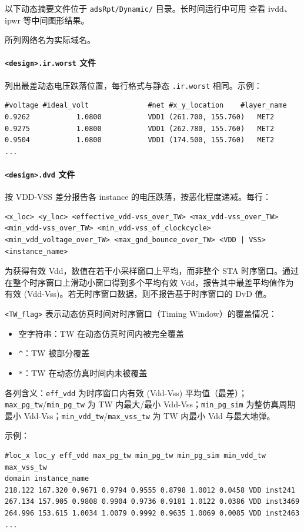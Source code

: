 以下动态摘要文件位于 \texttt{adsRpt/Dynamic/} 目录。长时间运行中可用  查看 ivdd、ipwr 等中间图形结果。
\begin{noteBox}
所列网络名为实际域名。
\end{noteBox}

\paragraph{\texttt{<design>.ir.worst} 文件}
列出最差动态电压跌落位置，每行格式与静态 \texttt{.ir.worst} 相同。示例：
\begin{lstlisting}
#voltage #ideal_volt              #net #x_y_location    #layer_name
0.9262           1.0800           VDD1 (261.700, 155.760)   MET2
0.9275           1.0800           VDD1 (262.780, 155.760)   MET2
0.9504           1.0800           VDD1 (174.500, 155.760)   MET2
...
\end{lstlisting}

\paragraph{\texttt{<design>.dvd} 文件}
按 VDD-VSS 差分报告各 instance 的电压跌落，按恶化程度递减。每行：
\begin{lstlisting}
<x_loc> <y_loc> <effective_vdd-vss_over_TW> <max_vdd-vss_over_TW>
<min_vdd-vss_over_TW> <min_vdd-vss_of_clockcycle>
<min_vdd_voltage_over_TW> <max_gnd_bounce_over_TW> <VDD | VSS>
<instance_name>
\end{lstlisting}
为获得有效 Vdd，数值在若干小采样窗口上平均，而非整个 STA 时序窗口。通过在整个时序窗口上滑动小窗口得到多个平均有效 Vdd，报告其中最差平均值作为有效 (Vdd-Vss)。若无时序窗口数据，则不报告基于时序窗口的 DvD 值。

\texttt{<TW\_flag>} 表示动态仿真时间对时序窗口（Timing Window）的覆盖情况：
\begin{itemize}
  \item 空字符串：TW 在动态仿真时间内被完全覆盖
  \item \texttt{\^{}}：TW 被部分覆盖
  \item \texttt{*}：TW 在动态仿真时间内未被覆盖
\end{itemize}
各列含义：\texttt{eff\_vdd} 为时序窗口内有效 (Vdd-Vss) 平均值（最差）；\texttt{max\_pg\_tw}/\texttt{min\_pg\_tw} 为 TW 内最大/最小 Vdd-Vss；\texttt{min\_pg\_sim} 为整仿真周期最小 Vdd-Vss；\texttt{min\_vdd\_tw}/\texttt{max\_vss\_tw} 为 TW 内最小 Vdd 与最大地弹。

示例：
\begin{lstlisting}
#loc_x loc_y eff_vdd max_pg_tw min_pg_tw min_pg_sim min_vdd_tw max_vss_tw
domain instance_name
218.122 167.320 0.9671 0.9794 0.9555 0.8798 1.0012 0.0458 VDD inst241
267.134 157.905 0.9808 0.9904 0.9736 0.9181 1.0122 0.0386 VDD inst3469
264.996 153.615 1.0034 1.0079 0.9992 0.9635 1.0069 0.0085 VDD inst2463
...
\end{lstlisting}

